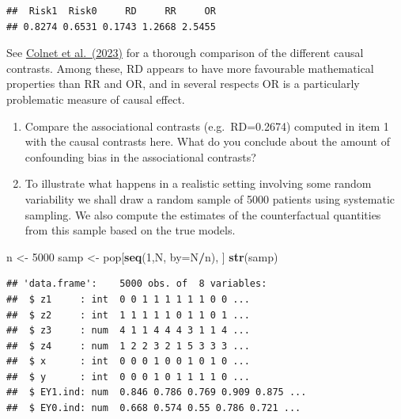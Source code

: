 \documentclass[
]{book}
\newenvironment{Shaded}{\begin{snugshade}}{\end{snugshade}}
\newcommand{\AttributeTok}[1]{\textcolor[rgb]{0.13,0.29,0.53}{#1}}
\newcommand{\DecValTok}[1]{\textcolor[rgb]{0.00,0.00,0.81}{#1}}
\newcommand{\FunctionTok}[1]{\textcolor[rgb]{0.13,0.29,0.53}{\textbf{#1}}}
\newcommand{\NormalTok}[1]{#1}
\newcommand{\OtherTok}[1]{\textcolor[rgb]{0.56,0.35,0.01}{#1}}
\newcommand{\SpecialCharTok}[1]{\textcolor[rgb]{0.81,0.36,0.00}{\textbf{#1}}}
\theoremstyle{definition}
\theoremstyle{definition}
\theoremstyle{definition}
\theoremstyle{definition}
\theoremstyle{remark}
\begin{document}
\begin{verbatim}
##  Risk1  Risk0     RD     RR     OR 
## 0.8274 0.6531 0.1743 1.2668 2.5455
\end{verbatim}

See \href{https://doi.org/10.48550/arXiv.2303.16008}{Colnet et al.~(2023)}
for a thorough
comparison of the different causal contrasts. Among these,
RD appears to have more favourable mathematical properties
than RR and OR, and in several respects OR is a
particularly problematic measure of causal effect.

\begin{enumerate}
\def\labelenumi{\arabic{enumi}.}
\setcounter{enumi}{2}
\item
  Compare the associational contrasts (e.g.~RD=0.2674) computed in
  item 1 with the causal contrasts here. What do you conclude about
  the amount of confounding bias in the associational contrasts?
\item
  To illustrate what happens in a realistic setting involving some
  random variability we shall draw a random sample of 5000 patients
  using systematic sampling. We also compute the estimates of the
  counterfactual quantities from this sample based on the true models.
\end{enumerate}

\begin{Shaded}
\begin{Highlighting}[]
\NormalTok{n }\OtherTok{\textless{}{-}} \DecValTok{5000}
\NormalTok{samp }\OtherTok{\textless{}{-}}\NormalTok{ pop[}\FunctionTok{seq}\NormalTok{(}\DecValTok{1}\NormalTok{,N, }\AttributeTok{by=}\NormalTok{N}\SpecialCharTok{/}\NormalTok{n), ]}
\FunctionTok{str}\NormalTok{(samp)}
\end{Highlighting}
\end{Shaded}

\begin{verbatim}
## 'data.frame':    5000 obs. of  8 variables:
##  $ z1     : int  0 0 1 1 1 1 1 1 0 0 ...
##  $ z2     : int  1 1 1 1 1 0 1 1 0 1 ...
##  $ z3     : num  4 1 1 4 4 4 3 1 1 4 ...
##  $ z4     : num  1 2 2 3 2 1 5 3 3 3 ...
##  $ x      : int  0 0 0 1 0 0 1 0 1 0 ...
##  $ y      : int  0 0 0 1 0 1 1 1 1 0 ...
##  $ EY1.ind: num  0.846 0.786 0.769 0.909 0.875 ...
##  $ EY0.ind: num  0.668 0.574 0.55 0.786 0.721 ...
\end{verbatim}

\begin{Shaded}
\end{Shaded}
\end{document}
